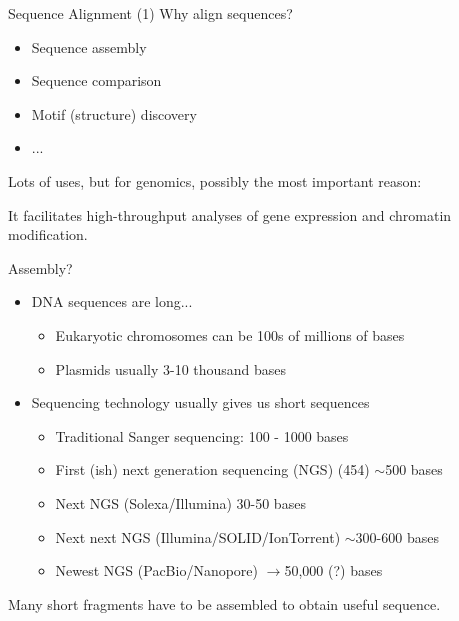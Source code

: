 \documentclass[pdf]{beamer}
\begin{document}
\begin{frame}[fragile]{Sequence Alignment (1)}
  Why align sequences?
  
  \begin{itemize}
    \item Sequence assembly
    \item Sequence comparison
    \item Motif (structure) discovery
    \item ...
  \end{itemize}
  \pause
  Lots of uses, but for genomics, possibly the most important reason:

  It facilitates high-throughput analyses of gene expression and chromatin modification.
\end{frame}

\begin{frame}{Assembly?}
  \begin{itemize}
  \item DNA sequences are long...
    \begin{itemize}
    \item Eukaryotic chromosomes can be 100s of millions of bases
    \item Plasmids usually 3-10 thousand bases
    \end{itemize}
  \item Sequencing technology usually gives us short sequences
    \pause
    \begin{itemize}
    \item Traditional Sanger sequencing: 100 - 1000 bases
    \item First (ish) next generation sequencing (NGS) (454) $\sim$500 bases
    \item Next NGS (Solexa/Illumina) 30-50 bases
    \item Next next NGS (Illumina/SOLID/IonTorrent) $\sim$300-600 bases
    \item Newest NGS (PacBio/Nanopore) $\rightarrow$50,000 (?) bases
    \end{itemize}
  \end{itemize}
  Many short fragments have to be assembled to obtain useful sequence.
\end{frame}

 
\end{document}
